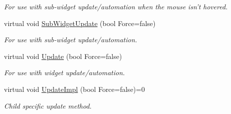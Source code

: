 \begin{DoxyCompactItemize}
\begin{DoxyCompactList}\small\item\em For use with sub-\/widget update/automation when the mouse isn't hovered. \item\end{DoxyCompactList}\item 
\hypertarget{classMezzanine_1_1UI_1_1Widget_a3fb336cd36759be294dfb845be810d0a}{
virtual void \hyperlink{classMezzanine_1_1UI_1_1Widget_a3fb336cd36759be294dfb845be810d0a}{SubWidgetUpdate} (bool Force=false)}
\label{classMezzanine_1_1UI_1_1Widget_a3fb336cd36759be294dfb845be810d0a}

\begin{DoxyCompactList}\small\item\em For use with sub-\/widget update/automation. \item\end{DoxyCompactList}\item 
\hypertarget{classMezzanine_1_1UI_1_1Widget_aeb05b9fb68cdfc58fcff45d03e80dd39}{
virtual void \hyperlink{classMezzanine_1_1UI_1_1Widget_aeb05b9fb68cdfc58fcff45d03e80dd39}{Update} (bool Force=false)}
\label{classMezzanine_1_1UI_1_1Widget_aeb05b9fb68cdfc58fcff45d03e80dd39}

\begin{DoxyCompactList}\small\item\em For use with widget update/automation. \item\end{DoxyCompactList}\item 
\hypertarget{classMezzanine_1_1UI_1_1Widget_abe60b3fb3de99433fe4823b12a43ffb4}{
virtual void \hyperlink{classMezzanine_1_1UI_1_1Widget_abe60b3fb3de99433fe4823b12a43ffb4}{UpdateImpl} (bool Force=false)=0}
\label{classMezzanine_1_1UI_1_1Widget_abe60b3fb3de99433fe4823b12a43ffb4}

\begin{DoxyCompactList}\small\item\em Child specific update method. \item\end{DoxyCompactList}\end{DoxyCompactItemize}
